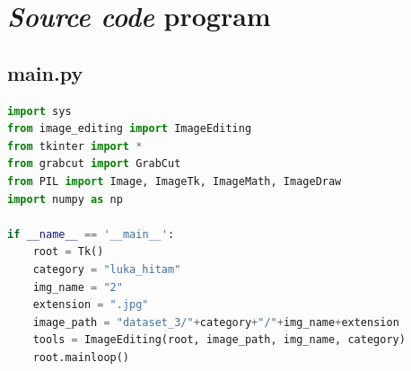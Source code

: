 \appendix


\chapter{\emph{Source code} program}

\section{main.py}
\begin{lstlisting}[language=Python, basicstyle=\tiny]
import sys
from image_editing import ImageEditing
from tkinter import *
from grabcut import GrabCut
from PIL import Image, ImageTk, ImageMath, ImageDraw
import numpy as np

if __name__ == '__main__':
    root = Tk()
    category = "luka_hitam"
    img_name = "2"
    extension = ".jpg"
    image_path = "dataset_3/"+category+"/"+img_name+extension
    tools = ImageEditing(root, image_path, img_name, category)
    root.mainloop()
\end{lstlisting}

